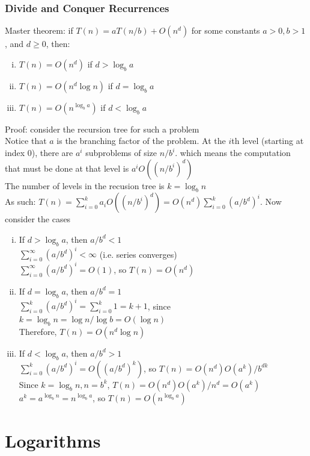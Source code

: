 \documentclass{article}
\begin{document}
			\subsubsection{Divide and Conquer Recurrences}
				Master theorem: if $T(n) = aT(n/b) + O(n^d)$ for some constants $a > 0, b > 1$, and $d \geq 0$, then:
				\begin{enumerate}[(i)]
					\item $T(n) = O(n^d)$ if $d > \log_b a$
					\item $T(n) = O(n^d \log n)$ if $d = \log_b a$
					\item $T(n) = O(n^{\log_b a})$ if $d < \log_b a$
					\end{enumerate}
				Proof: consider the recursion tree for such a problem \\
				Notice that $a$ is the branching factor of the problem. At the $i$th level (starting at index 0), there are $a^i$ subproblems of size $n/b^i$. which means the computation that must be done at that level is $a^iO((n/b^i)^d)$ \\
				The number of levels in the recusion tree is $k = \log_b n$ \\
				As such: $T(n) = \sum_{i = 0}^k a_iO((n/b^i)^d) = O(n^d)\sum_{i = 0}^k(a/b^d)^i$. Now consider the cases
				\begin{enumerate}[(i)]
					\item If $d > \log_b a$, then $a/b^d < 1$ \\
					$\sum_{i = 0}^\infty (a/b^d)^i < \infty$ (i.e. series converges) \\
					$\sum_{i = 0}^\infty (a/b^d)^i = O(1)$, so $T(n) = O(n^d)$
					\item If $d = \log_b a$, then $a/b^d = 1$ \\
					$\sum_{i = 0}^k (a/b^d)^i = \sum_{i = 0}^k 1 = k + 1$, since $k = \log_b n = \log n/\log b = O(\log n)$ \\
					Therefore, $T(n) = O(n^d\log n)$
					\item If $d < \log_b a$, then $a/b^d > 1$ \\
					$\sum_{i = 0}^k (a/b^d)^i = O((a/b^d)^k)$, so $T(n) = O(n^d)O(a^k)/b^{dk}$ \\
					Since $k = \log_b n, n = b^k$, $T(n) = O(n^d)O(a^k)/n^d = O(a^k)$ \\
					$a^k = a^{\log_b n} = n^{\log_b a}$, so $T(n) = O(n^{\log_b a})$
					\end{enumerate}

	\appendix

	\section{Logarithms}


	
\end{document}
